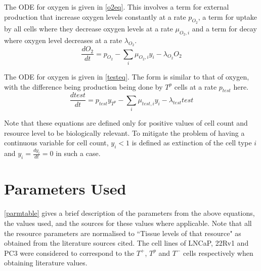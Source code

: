 The ODE for oxygen is given in \autoref{o2eq}. This involves a term for external production that increase oxygen levels constantly at a rate $p_{O_2}$, a term for uptake by all cells where they decrease oxygen levels at a rate $\mu_{O_2,i}$ and a term for decay where oxygen level decreases at a rate $\lambda_{O_2}$.
\begin{equation}
  \frac{dO_2}{dt} = p_{O_2} - \sum_i \mu_{O_2,i} y_i - \lambda_{O_2} O_2
  \label{o2eq}
\end{equation}

The ODE for oxygen is given in \autoref{testeq}. The form is similar to that of oxygen, with the difference being production being done by $T^p$ cells at a rate $p_{test}$ here.
\begin{equation}
  \frac{dtest}{dt} = p_{test} y_{T^p} - \sum_i \mu_{test,i} y_i - \lambda_{test} test
  \label{testeq}
\end{equation}

Note that these equations are defined only for positive values of cell count and resource level to be biologically relevant. To mitigate the problem of having a continuous variable for  cell count, $y_i < 1$ is defined as extinction of the cell type $i$ and $y_i = \frac{dy_i}{dt} = 0$ in such a case.

\section{Parameters Used}
\autoref{parmtable} gives a brief description of the parameters from the above equations, the values used, and the sources for these values where applicable. Note that all the resource parameters are normalised to ``Tissue levels of that resource" as obtained from the literature sources cited. The cell lines of LNCaP, 22Rv1 and PC3 were considered to correspond to the $T^+$, $T^p$ and $T^-$ cells respectively when obtaining literature values.

